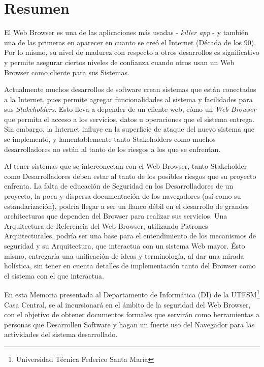 
\section*{Resumen}
\label{chap:resumen}

El Web Browser es una de las aplicaciones más usadas - \textit{killer app} - y también una de las primeras en aparecer en cuanto se creó el Internet (Década de los 90). Por lo mismo, su nivel de madurez con respecto a otros desarrollos es significativo y permite asegurar ciertos niveles de confianza cuando otros usan un Web Browser como cliente para sus Sistemas. 

Actualmente muchos desarrollos de software crean sistemas que están conectados a la Internet, pues permite agregar funcionalidades al sistema y facilidades para sus \textit{Stakeholders}. Esto lleva a depender de un cliente web, cómo un \textit{Web Browser} que permita el acceso a los servicios, datos u operaciones que el sistema entrega. Sin embargo, la Internet influye en la superficie de ataque del nuevo sistema que se implementó, y lamentablemente tanto Stakeholders como muchos desarrolladores no están al tanto de los riesgos a los que se enfrentan.

Al tener sistemas que se interconectan con el Web Browser, tanto Stakeholder como Desarrolladores deben estar al tanto de los posibles riesgos que su proyecto enfrenta. La falta de educación de Seguridad en los Desarrolladores de un proyecto, la poca y dispersa documentación de los navegadores (así como su estandarización), podría llegar a ser un flanco débil en el desarrollo de grandes architecturas que dependen del Browser para realizar sus servicios. Una Arquitectura de Referencia del Web Browser, utilizando Patrones Arquitecturales, podría ser una base para el entendimiento de los mecanismos de seguridad y su Arquitectura, que interactua con un sistema Web mayor. Ésto mismo, entregaría una unificación de ideas y terminología, al dar una mirada holística, sin tener en cuenta detalles de implementación tanto del Browser como el sistema con el que interactua.

En esta Memoria presentada al Departamento de Informática (DI) de la UTFSM\footnote{Universidad Técnica Federico Santa María} Casa Central, se al incursionará en el ámbito de la seguridad del Web Browser, con el objetivo de obtener documentos formales que servirán como herramientas a personas que Desarrollen Software y hagan un fuerte uso del Navegador para las actividades del sistema desarrollado.

